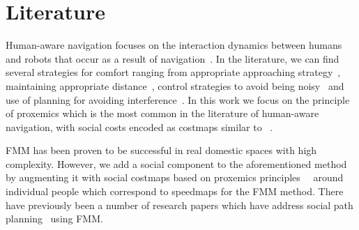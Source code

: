 \section{Literature}


Human-aware navigation focuses on the interaction dynamics between humans and robots that occur as a result of navigation~\cite{Kruse2013}. 
In the literature, we can find several strategies for comfort ranging from appropriate approaching strategy~\cite{Dautenhahn2006}, maintaining appropriate distance~\cite{Takayama2009}, control strategies to avoid being noisy~\cite{Martinson2007} and use of planning for avoiding interference~\cite{Vasquez2012}. In this work we focus on the principle of proxemics which is the most common in the literature of human-aware navigation, with social costs encoded as costmaps similar to ~\cite{gomez2013social}.


FMM has been proven to be successful in real domestic spaces with high complexity\cite{ventura2015}. However, we add a social component to the aforementioned method by augmenting it with social costmaps \textemdash based on proxemics principles~\cite{kirby2009companion}\textemdash~ around individual people which correspond to speedmaps for the FMM method. %
There have previously been a number of research papers which have address social path planning~\cite{gomez2014fast,gomez2013social} using FMM. %

